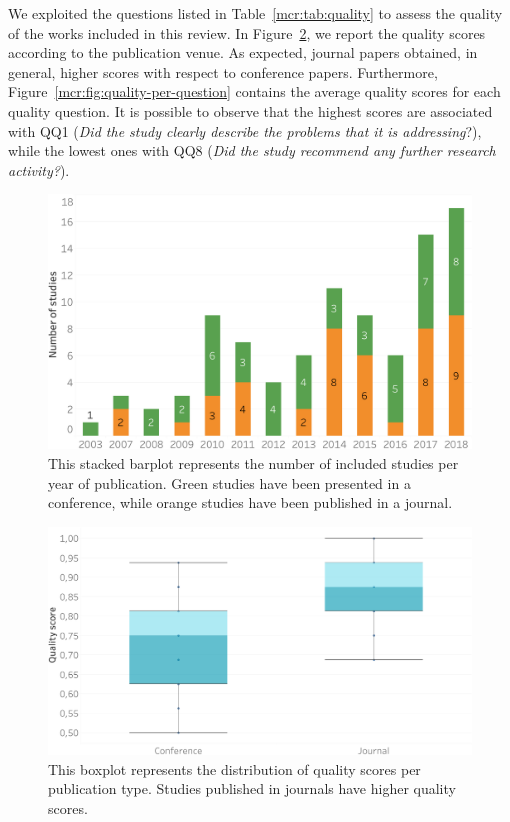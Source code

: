 We exploited the questions listed in Table~\ref{mcr:tab:quality} to assess the quality of the works included in this review. In Figure~\ref{mcr:fig:quality-per-type}, we report the quality scores according to the publication venue. As expected, journal papers obtained, in general, higher scores with respect to conference papers. Furthermore, Figure~\ref{mcr:fig:quality-per-question} contains the average quality scores for each quality question. It is possible to observe that the highest scores are associated with QQ1 (\emph{Did the study clearly describe the problems that it is addressing}?), while the lowest ones with QQ8 (\emph{Did the study recommend any further research activity?}).

\begin{figure}
\centering
\includegraphics[width=\textwidth]{study_per_year}
\caption[Studies per year of publication]{This stacked barplot represents the number of included studies per year of publication. Green studies have been presented in a conference, while orange studies have been published in a journal.}
\label{mcr:fig:study-per-year}
\end{figure}

\begin{figure}
\centering
\includegraphics[width=\textwidth]{quality_per_type}
\caption[Quality scores per publication type]{This boxplot represents the distribution of quality scores per publication type. Studies published in journals have higher quality scores.}
\label{mcr:fig:quality-per-type}
\end{figure}

